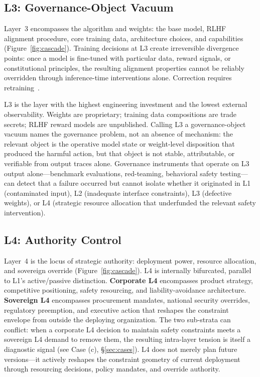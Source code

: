 \subsection{L3: Governance-Object Vacuum}

Layer~3 encompasses the algorithm and weights: the base model, RLHF alignment procedure, core training data, architecture choices, and capabilities (Figure~\ref{fig:cascade}). Training decisions at L3 create irreversible divergence points: once a model is fine-tuned with particular data, reward signals, or constitutional principles, the resulting alignment properties cannot be reliably overridden through inference-time interventions alone. Correction requires retraining~\cite{wei2024jailbroken, greshake2023not}.

L3 is the layer with the highest engineering investment and the lowest external observability. Weights are proprietary; training data compositions are trade secrets; RLHF reward models are unpublished. Calling L3 a governance-object vacuum names the governance problem, not an absence of mechanism: the relevant object is the operative model state or weight-level disposition that produced the harmful action, but that object is not stable, attributable, or verifiable from output traces alone. Governance instruments that operate on L3 output alone---benchmark evaluations, red-teaming, behavioral safety testing---can detect that a failure occurred but cannot isolate whether it originated in L1 (contaminated input), L2 (inadequate interface constraints), L3 (defective weights), or L4 (strategic resource allocation that underfunded the relevant safety intervention).

\subsection{L4: Authority Control}

Layer~4 is the locus of strategic authority: deployment power, resource allocation, and sovereign override (Figure~\ref{fig:cascade}). L4 is internally bifurcated, parallel to L1's active/passive distinction. \textbf{Corporate L4} encompasses product strategy, competitive positioning, safety resourcing, and liability-avoidance architecture. \textbf{Sovereign L4} encompasses procurement mandates, national security overrides, regulatory preemption, and executive action that reshapes the constraint envelope from outside the deploying organization. The two sub-strata can conflict: when a corporate L4 decision to maintain safety constraints meets a sovereign L4 demand to remove them, the resulting intra-layer tension is itself a diagnostic signal (see Case (c), \S\ref{sec:cases}). L4 does not merely plan future versions---it actively reshapes the constraint geometry of current deployment through resourcing decisions, policy mandates, and override authority.

